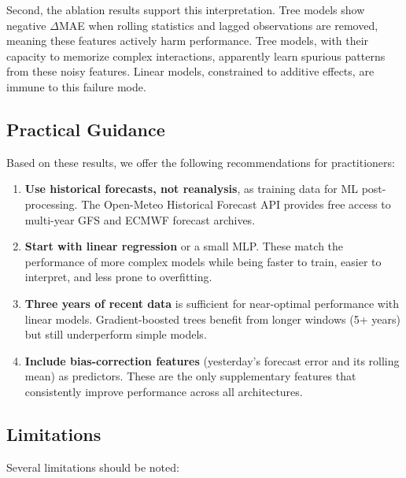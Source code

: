 \documentclass[12pt, letterpaper]{article}
\begin{document}
Second, the ablation results support this interpretation. Tree models show negative
$\Delta$MAE when rolling statistics and lagged observations are removed, meaning
these features actively harm performance. Tree models, with their capacity to
memorize complex interactions, apparently learn spurious patterns from these noisy
features. Linear models, constrained to additive effects, are immune to this
failure mode.

\subsection{Practical Guidance}

Based on these results, we offer the following recommendations for practitioners:

\begin{enumerate}
  \item \textbf{Use historical forecasts, not reanalysis}, as training data for ML
    post-processing. The Open-Meteo Historical Forecast API provides free access to
    multi-year GFS and ECMWF forecast archives.
  \item \textbf{Start with linear regression} or a small MLP. These match the
    performance of more complex models while being faster to train, easier to
    interpret, and less prone to overfitting.
  \item \textbf{Three years of recent data} is sufficient for near-optimal
    performance with linear models. Gradient-boosted trees benefit from longer
    windows (5+ years) but still underperform simple models.
  \item \textbf{Include bias-correction features} (yesterday's forecast error and
    its rolling mean) as predictors. These are the only supplementary features that
    consistently improve performance across all architectures.
\end{enumerate}

\subsection{Limitations}
\label{sec:limitations}

Several limitations should be noted:
\end{document}
